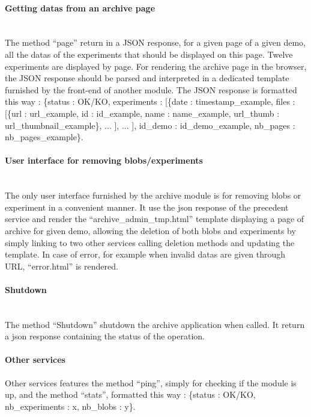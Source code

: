 \paragraph{Getting datas from an archive page} \hspace{0pt} \\
The method ``page'' return in a JSON response, for a given page of a given demo, all the datas of the experiments that should be displayed on this page. Twelve experiments are displayed by page. For rendering the archive page in the browser, the JSON response should be parsed and interpreted in a dedicated template furnished by the front-end of another module. The JSON response is formatted this way : \{status :  OK/KO, experiments : [\{date : timestamp\_example, files : [\{url : url\_example, id : id\_example, name : name\_example, url\_thumb : url\_thumbnail\_example\}, ... ], ... ], id\_demo : id\_demo\_example, nb\_pages : nb\_pages\_example\}.

\paragraph{User interface for removing blobs/experiments} \hspace{0pt} \\
The only user interface furnished by the archive module is for removing blobs or experiment in a convenient manner. It use the json response of the precedent service and render the ``archive\_admin\_tmp.html'' template displaying a page of archive for given demo, allowing the deletion of both blobs and experiments by simply linking to two other services calling deletion methods and updating the template. In case of error, for example when invalid datas are given through URL, ``error.html'' is rendered.

\paragraph{Shutdown} \hspace{0pt} \\
The method ``Shutdown'' shutdown the archive application when called. It return a json response containing the status of the operation.

\paragraph{Other services}
Other services features the method ``ping'', simply for checking if the module is up, and the method ``stats'', formatted this way : \{status : OK/KO, nb\_experiments : x, nb\_blobs : y\}.
